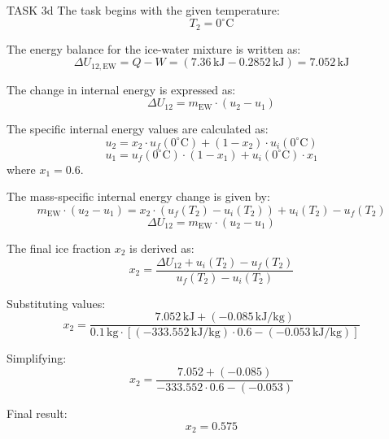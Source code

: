 TASK 3d  
The task begins with the given temperature:  
\[
T_2 = 0^\circ \text{C}
\]

The energy balance for the ice-water mixture is written as:  
\[
\Delta U_{12,\text{EW}} = Q - W = (7.36 \, \text{kJ} - 0.2852 \, \text{kJ}) = 7.052 \, \text{kJ}
\]

The change in internal energy is expressed as:  
\[
\Delta U_{12} = m_{\text{EW}} \cdot (u_2 - u_1)
\]

The specific internal energy values are calculated as:  
\[
u_2 = x_2 \cdot u_f(0^\circ \text{C}) + (1 - x_2) \cdot u_i(0^\circ \text{C})
\]  
\[
u_1 = u_f(0^\circ \text{C}) \cdot (1 - x_1) + u_i(0^\circ \text{C}) \cdot x_1
\]  
where \( x_1 = 0.6 \).

The mass-specific internal energy change is given by:  
\[
m_{\text{EW}} \cdot (u_2 - u_1) = x_2 \cdot (u_f(T_2) - u_i(T_2)) + u_i(T_2) - u_f(T_2)
\]  
\[
\Delta U_{12} = m_{\text{EW}} \cdot (u_2 - u_1)
\]

The final ice fraction \( x_2 \) is derived as:  
\[
x_2 = \frac{\Delta U_{12} + u_i(T_2) - u_f(T_2)}{u_f(T_2) - u_i(T_2)}
\]

Substituting values:  
\[
x_2 = \frac{7.052 \, \text{kJ} + (-0.085 \, \text{kJ/kg})}{0.1 \, \text{kg} \cdot \left[ (-333.552 \, \text{kJ/kg}) \cdot 0.6 - (-0.053 \, \text{kJ/kg}) \right]}
\]

Simplifying:  
\[
x_2 = \frac{7.052 + (-0.085)}{-333.552 \cdot 0.6 - (-0.053)}
\]

Final result:  
\[
x_2 = 0.575
\]